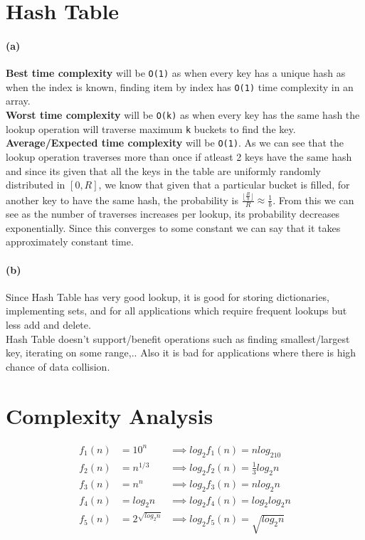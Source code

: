 \documentclass{article}
\begin{document}
\pagebreak
\section{Hash Table}
\label{sec:4}

\paragraph{(a)}

\textbf{Best time complexity} will be \verb~O(1)~ as when every key has a unique hash as when the index is known, finding item by index has \verb~O(1)~ time complexity in an array.\\

\textbf{Worst time complexity} will be \verb~O(k)~ as when every key has the same hash the lookup operation will traverse maximum \verb~k~ buckets to find the key.\\

\textbf{Average/Expected time complexity} will be \verb~O(1)~. As we can see that the lookup operation traverses more than once if atleast 2 keys have the same hash and since its given that all the keys in the table are uniformly randomly distributed in $[0,R]$, we know that given that a particular bucket is filled, for another key to have the same hash, the probability is $\frac{\lfloor \frac{R}{b} \rfloor}{R} \approx \frac{1}{b}$. From this we can see as the number of traverses increases per lookup, its probability decreases exponentially. Since this converges to some constant we can say that it takes approximately constant time.

\paragraph{(b)}
Since Hash Table has very good lookup, it is good for storing dictionaries, implementing sets, and for all applications which require frequent lookups but less add and delete.\\

Hash Table doesn't support/benefit operations such as finding smallest/largest key, iterating on some range,.. Also it is bad for applications where there is high chance of data collision.

\section{Complexity Analysis}
\label{sec:5}
\begin{align*}
  f_1(n) &= 10^n            &\implies log_2f_1(n) = nlog_210\\
  f_2(n) &= n^{1/3}          &\implies log_2f_2(n) = \frac{1}{3}log_2n\\
  f_3(n) &= n^n             &\implies log_2f_3(n) = nlog_2n\\
  f_4(n) &= log_2n          &\implies log_2f_4(n) = log_2log_2n\\
  f_5(n) &= 2^{\sqrt{log_2n}} &\implies log_2f_5(n) = \sqrt{log_2n}\\
\end{align*}
\end{document}
